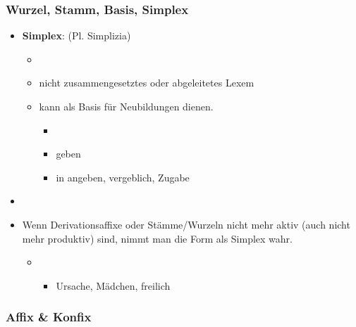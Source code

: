 \begin{frame}
\frametitle{Wurzel, Stamm, Basis, Simplex}

\begin{itemize}
	\item \textbf{Simplex}: (Pl. Simplizia)
	
	\begin{itemize}
		\item[]
		\item nicht zusammengesetztes oder abgeleitetes Lexem
		\item kann als Basis für Neubildungen dienen.
		
		\begin{itemize}
			\item[]
			\item geben
			\item in angeben, vergeblich, Zugabe
		\end{itemize}
		
	\end{itemize}
		
		\item[]
		\item Wenn Derivationsaffixe oder Stämme/Wurzeln nicht mehr aktiv (auch nicht mehr produktiv) sind, nimmt man die Form als Simplex wahr.
		
	\begin{itemize}
		\item[]
		\begin{itemize}
			\item Ursache, Mädchen, freilich
		\end{itemize}
	\end{itemize}
\end{itemize}


\end{frame}


\subsubsection{Affix \& Konfix}


